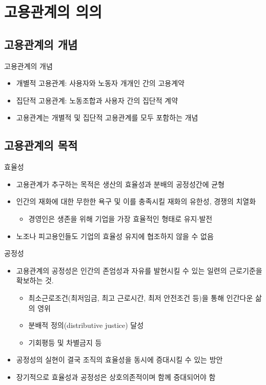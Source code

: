 \documentclass[aspectratio=169,xcolor=dvipsnames,handout]{beamer}
\begin{document}
\section{고용관계의 의의}

\subsection{고용관계의 개념}
\begin{frame}{고용관계의 개념}
    \begin{itemize}
        \item 개별적 고용관계: 사용자와 노동자 개개인 간의 고용계약
        \item 집단적 고용관계: 노동조합과 사용자 간의 집단적 계약
        \item 고용관계는 개별적 및 집단적 고용관계를 모두 포함하는 개념
    \end{itemize}
\end{frame}

\subsection{고용관계의 목적}

\begin{frame}{효율성}
    \begin{itemize}
        \item 고용관계가 추구하는 목적은 생산의 효율성과 분배의 공정성간에 균형
        \item 인간의 재화에 대한 무한한 욕구 및 이를 충족시킬 재화의 유한성, 경쟁의 치열화 
            \begin{itemize}
                \item 경영인은 생존을 위해 기업을 가장 효율적인 형태로 유지$\cdot$발전
            \end{itemize}
        \item 노조나 피고용인들도 기업의 효율성 유지에 협조하지 않을 수 없음
    \end{itemize}
\end{frame}

\begin{frame}{공정성}
    \begin{itemize}
        \item 고용관계의 공정성은 인간의 존엄성과 자유를 발현시킬 수 있는 일련의 근로기준을 확보하는 것.
        \begin{itemize}
            \item 최소근로조건(최저임금, 최고 근로시간, 최저 안전조건 등)을 통해 인간다운 삶의 영위
            \item 분배적 정의(distributive justice) 달성
            \item 기회평등 및 차별금지 등 
        \end{itemize}
        \item  공정성의 실현이 결국 조직의 효율성을 동시에 증대시킬 수 있는 방안
    \item 장기적으로 효율성과 공정성은 상호의존적이며 함께 증대되어야 함
    \end{itemize}
\end{frame}
\end{document}
